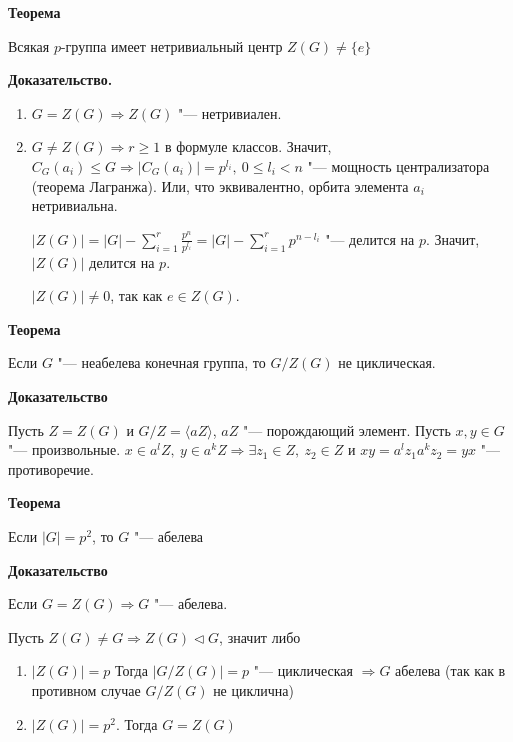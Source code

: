 \documentclass{article}
\begin{document}
\vspace{10pt}

\textbf{Теорема}

Всякая $p$-группа имеет нетривиальный центр $Z(G) \neq \{e\}$

\vspace{5pt}

\textbf{Доказательство.}
\begin{enumerate}
	\item $G = Z(G) \Rightarrow Z(G)$ "--- нетривиален.
	\item $G \neq Z(G) \Rightarrow r \geq 1$ в формуле классов. Значит, $C_G(a_i) \leq G \Rightarrow |C_G(a_i)| = p^{l_i}, \  0 \leq l_i < n$ "--- мощность централизатора (теорема Лагранжа). Или, что эквивалентно, орбита элемента $a_i$ нетривиальна.
	
	$|Z(G)| = |G| - \sum \limits_{i=1}^r \frac{p^n}{p^{l_i}} = |G| - \sum \limits_{i=1}^r p^{n-l_i}$ "--- делится на $p$. Значит, $|Z(G)|$ делится на $p$.
	
	$|Z(G)| \neq 0$, так как $e \in Z(G)$.
\end{enumerate}

\vspace{10pt}

\textbf{Теорема}

Если $G$ "--- неабелева конечная группа, то $G/Z(G)$ не циклическая.

\vspace{5pt}

\textbf{Доказательство}

Пусть $Z = Z(G)$ и $G/Z = \langle aZ \rangle$, $aZ$ "--- порождающий элемент. Пусть $x, y \in G$ "--- произвольные. $x \in a^lZ, \  y \in a^kZ \Rightarrow \exists z_1 \in Z, \  z_2 \in Z$ и $xy = a^lz_1a^kz_2 = yx$ "--- противоречие.

\vspace{10pt}

\textbf{Теорема}

Если $|G| = p^2$, то $G$ "--- абелева

\vspace{5pt}

\textbf{Доказательство}

Если $G = Z(G) \Rightarrow G$ "--- абелева.

Пусть $Z(G) \neq G \Rightarrow Z(G) \triangleleft G$, значит либо
\begin{enumerate}
	\item $|Z(G)| = p$
	Тогда $|G/Z(G)| = p$ "--- циклическая $\Rightarrow G$ абелева (так как в противном случае $G/Z(G)$ не циклична)
	
	\item $|Z(G)| = p^2$. Тогда $G = Z(G)$
\end{enumerate}
\end{document}

